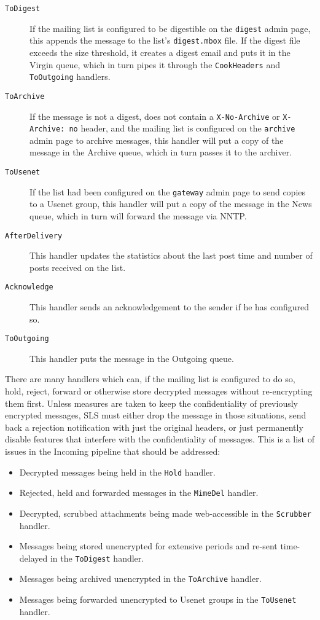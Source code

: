 \documentclass[a4]{article}
\newcommand{\file}[1]{\texttt{#1}}
\newcommand{\hdr}[1]{\texttt{#1}}
\newcommand{\handler}[1]{\texttt{#1}}
\newcommand{\page}[1]{\nolinkurl{#1}}
\begin{document}
\begin{description}
\item[\tt ToDigest]
If the mailing list is configured to be digestible on the \page{digest} admin page,
this appends the message to the list's \file{digest.mbox} file.
If the digest file exceeds the size threshold, it creates a digest email and puts it in the Virgin queue,
which in turn pipes it through the \handler{CookHeaders} and \handler{ToOutgoing} handlers.

\item[\tt ToArchive]
If the message is not a digest, does not contain a \hdr{X-No-Archive} or \hdr{X-Archive: no} header,
and the mailing list is configured on the \page{archive} admin page to archive messages,
this handler will put a copy of the message in the Archive queue,
which in turn passes it to the archiver.

\item[\tt ToUsenet]
If the list had been configured on the \page{gateway} admin page to send copies to a Usenet group,
this handler will put a copy of the message in the News queue,
which in turn will forward the message via NNTP.

\item[\tt AfterDelivery]
This handler updates the statistics about the last post time and number of posts received on the list.

\item[\tt Acknowledge]
This handler sends an acknowledgement to the sender if he has configured so.

\item[\tt ToOutgoing]
This handler puts the message in the Outgoing queue.
\end{description}

There are many handlers which can, if the mailing list is configured to do so,
hold, reject, forward or otherwise store decrypted messages without re-encrypting them first.
Unless measures are taken to keep the confidentiality of previously encrypted messages,
SLS must either drop the message in those situations, send back a rejection notification with just the original headers,
or just permanently disable features that interfere with the confidentiality of messages.
This is a list of issues in the Incoming pipeline that should be addressed:

\begin{itemize}
\item Decrypted messages being held in the \handler{Hold} handler.
\item Rejected, held and forwarded messages in the \handler{MimeDel} handler.
\item Decrypted, scrubbed attachments being made web-accessible in the \handler{Scrubber} handler.
\item Messages being stored unencrypted for extensive periods and re-sent time-delayed in the \handler{ToDigest} handler.
\item Messages being archived unencrypted in the \handler{ToArchive} handler.
\item Messages being forwarded unencrypted to Usenet groups in the \handler{ToUsenet} handler.
\end{itemize}
\end{document}

